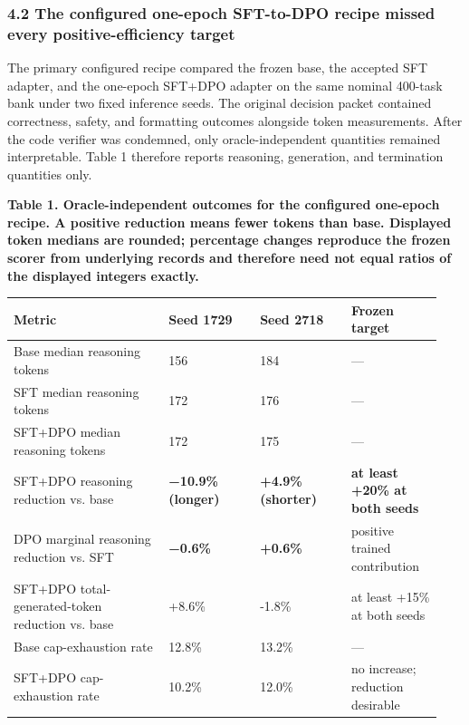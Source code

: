 \documentclass[
  9pt,
  letterpaper,
]{article}
\begin{document}
\hypertarget{42-the-configured-one-epoch-sft-to-dpo-recipe-missed-every-positive-efficiency-target}{%
\subsubsection{4.2 The configured one-epoch SFT-to-DPO recipe missed
every positive-efficiency
target}\label{42-the-configured-one-epoch-sft-to-dpo-recipe-missed-every-positive-efficiency-target}}

The primary configured recipe compared the frozen base, the accepted SFT
adapter, and the one-epoch SFT+DPO adapter on the same nominal 400-task
bank under two fixed inference seeds. The original decision packet
contained correctness, safety, and formatting outcomes alongside token
measurements. After the code verifier was condemned, only
oracle-independent quantities remained interpretable. Table 1 therefore
reports reasoning, generation, and termination quantities only.

\textbf{Table 1. Oracle-independent outcomes for the configured
one-epoch recipe. A positive reduction means fewer tokens than base.
Displayed token medians are rounded; percentage changes reproduce the
frozen scorer from underlying records and therefore need not equal
ratios of the displayed integers exactly.}

\begin{longtable}[]{@{}p{0.34\linewidth}p{0.20\linewidth}p{0.20\linewidth}p{0.20\linewidth}@{}}
\toprule\noalign{}
Metric & Seed 1729 & Seed 2718 & Frozen target \\
\midrule\noalign{}
\endhead
\bottomrule\noalign{}
\endlastfoot
Base median reasoning tokens & 156 & 184 & --- \\
SFT median reasoning tokens & 172 & 176 & --- \\
SFT+DPO median reasoning tokens & 172 & 175 & --- \\
SFT+DPO reasoning reduction vs. base & \textbf{−10.9\% (longer)} &
\textbf{+4.9\% (shorter)} & \textbf{at least +20\% at both seeds} \\
DPO marginal reasoning reduction vs. SFT & \textbf{−0.6\%} &
\textbf{+0.6\%} & positive trained contribution \\
SFT+DPO total-generated-token reduction vs. base & +8.6\% & -1.8\% & at
least +15\% at both seeds \\
Base cap-exhaustion rate & 12.8\% & 13.2\% & --- \\
SFT+DPO cap-exhaustion rate & 10.2\% & 12.0\% & no increase; reduction
desirable \\
\end{longtable}
\end{document}
